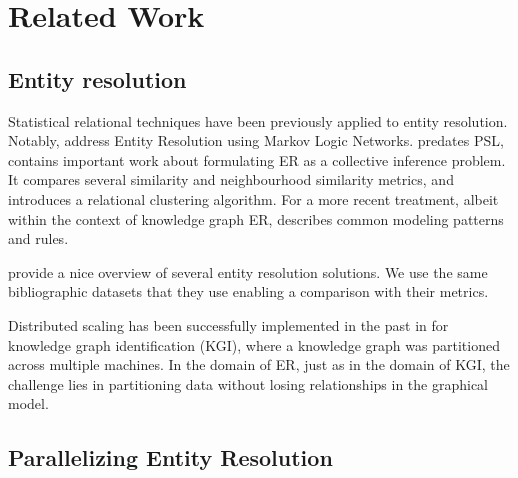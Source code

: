 \documentclass{article}
\begin{document}
\section{Related Work}
    
    \subsection{Entity resolution}
        
        Statistical relational techniques have been previously applied to entity resolution.
        Notably, \cite{singla2006entity} address Entity Resolution using Markov Logic Networks.
        \cite{bhattacharya:thesis06} predates PSL, contains important work about formulating ER as a collective inference problem.
        It compares several similarity and neighbourhood similarity metrics, and introduces a relational clustering algorithm.
        For a more recent treatment, albeit within the context of knowledge graph ER, \cite{pujara:starai16} describes common modeling patterns and rules.
        
        \cite{kopcke2010frameworks} provide a nice overview of several entity resolution solutions.
        We use the same bibliographic datasets that they use enabling a comparison with their metrics.
        
        Distributed scaling has been successfully implemented in the past in \cite{pujara:thesis16} for knowledge graph identification (KGI), where a knowledge graph was partitioned across multiple machines.
        In the domain of ER, just as in the domain of KGI, the challenge lies in partitioning data without losing relationships in the graphical model.
        
    \subsection{Parallelizing Entity Resolution}
        
\end{document}

